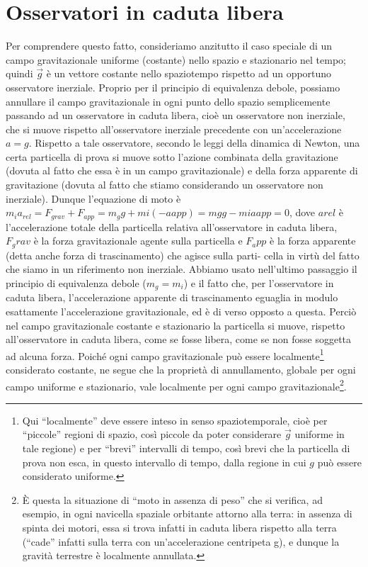 \section{Osservatori in caduta libera}
Per comprendere questo fatto, consideriamo anzitutto il caso speciale di
un campo gravitazionale uniforme (costante) nello spazio e stazionario nel
tempo; quindi $\vec{g}$ è un vettore costante nello spaziotempo rispetto ad un opportuno 
osservatore inerziale. Proprio per il principio di equivalenza debole,
possiamo annullare il campo gravitazionale in ogni punto dello spazio semplicemente 
passando ad un osservatore in caduta libera, cioè un osservatore
non inerziale, che si muove rispetto all'osservatore inerziale precedente con
un'accelerazione $a = g$. 
Rispetto a tale osservatore, secondo le leggi della
dinamica di Newton, una certa particella di prova si muove sotto l'azione
combinata della gravitazione (dovuta al fatto che essa è in un campo gravitazionale) 
e della forza apparente di gravitazione (dovuta al fatto che stiamo
considerando un osservatore non inerziale). Dunque l'equazione di moto è
$m_i a_{rel} = F_{grav} + F_{app} = m_g g + mi (-aapp ) = mg g - mi aapp = 0$,
dove $arel$ è l'accelerazione totale della particella relativa all'osservatore in caduta 
libera, $F_grav$ è la forza gravitazionale agente sulla particella e $F_app$ è la
forza apparente (detta anche forza di trascinamento) che agisce sulla parti-
cella in virtù del fatto che siamo in un riferimento non inerziale. Abbiamo
usato nell'ultimo passaggio il principio di equivalenza debole ($m_g = m_i$) e
il fatto che, per l'osservatore in caduta libera, l'accelerazione apparente di
trascinamento eguaglia in modulo esattamente l'accelerazione gravitazionale,
ed è di verso opposto a questa. Perciò nel campo gravitazionale costante e
stazionario la particella si muove, rispetto all'osservatore in caduta libera,
come se fosse libera, come se non fosse soggetta ad alcuna forza.
Poiché ogni campo gravitazionale può essere localmente\footnote{
Qui ``localmente'' deve essere inteso in senso spaziotemporale, 
cioè per ``piccole'' regioni di spazio, così piccole da poter considerare $\vec{g}$ 
uniforme in tale regione) e per ``brevi'' intervalli di tempo,
così brevi che la particella di prova non esca, in questo intervallo di
tempo, dalla regione in cui $g$ può essere considerato uniforme.} considerato costante, 
ne segue che la proprietà di annullamento, globale per ogni campo
uniforme e stazionario, vale localmente per ogni campo gravitazionale\footnote{È 
questa la situazione di ``moto in assenza di peso'' che si verifica, ad esempio, in ogni
navicella spaziale orbitante attorno alla terra: in assenza di spinta dei motori, essa si trova
infatti in caduta libera rispetto alla terra (``cade'' infatti sulla terra con un'accelerazione
centripeta g), e dunque la gravità terrestre è localmente annullata.}.

